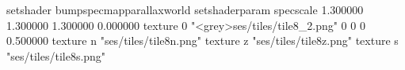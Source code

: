 setshader bumpspecmapparallaxworld
setshaderparam specscale 1.300000 1.300000 1.300000 0.000000
texture 0 "<grey>ses/tiles/tile8_2.png" 0 0 0 0.500000
texture n "ses/tiles/tile8n.png"
texture z "ses/tiles/tile8z.png"
texture s "ses/tiles/tile8s.png"


